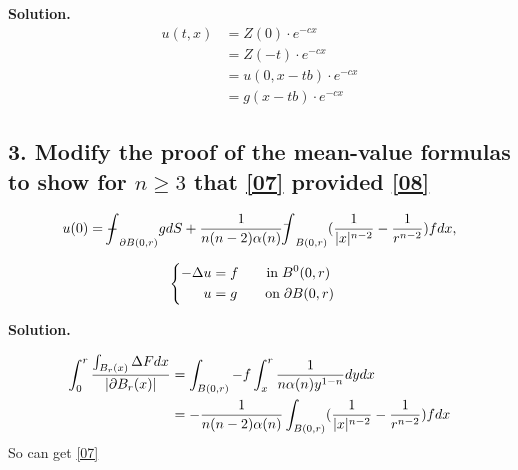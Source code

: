 \documentclass[a4paper]{book}
\newenvironment{solution}%
{\noindent\textbf{Solution.}}%
{\qedhere}
\newcommand\tbint{{\mathchar '26\mkern -14mu\int}}
\newcommand\dbbint{{-\mkern -19mu\int}}
\numberwithin{equation}{chapter}
\theoremstyle{definition}
\begin{document}
\begin{multicols}{2}
\begin{solution}
	\begin{equation}
		\begin{aligned}
		u(t, x) &= Z(0)\cdot e^{-cx} \\
		& = Z(-t)\cdot e^{-cx} \\
		& = u(0, x - tb)\cdot e^{-cx} \\
		& = g(x - tb) \cdot e^{-cx}
		\end{aligned}
	\end{equation}
\end{solution}
%


\subsection{3. Modify the proof of the mean-value formulas to show for $ n \geq 3$ that \ref{07} provided \ref{08} }

\small\begin{equation}\label{07}
	u(0) = \dbbint_{\partial \mathnormal{B}(0,r)} g d \mathnormal{S} + \frac{1}{n(n-2)\alpha(n)} \tbint_{\mathnormal{B}(0,r)}( \frac{1}{|x|^{n-2}} -
	 \frac{1}{r^{n-2}}) f dx, 
\end{equation}

\begin{equation}\label{08}
	\begin{cases}
	\begin{aligned}
	-\Delta u &= f \qquad \text{in} \; \mathnormal{B}^0(0,r) \\
	u &= g \qquad \text{on} \; \partial\mathnormal{B}(0,r)
	\end{aligned}
	
	\end{cases}
\end{equation}

\begin{solution}
	
%	
%	
	
	\begin{equation}
		\begin{aligned}
		\int_{0}^{r} \frac{\int_{\mathnormal{B}_r (x)} \Delta F dx}{| \partial \mathnormal{B}_r (x) |} &= \int_{\mathnormal{B}(0,r)} -f \int_{x}^{r} \frac{1}{n\alpha(n) y^{1-n}} dy dx \\
		&= -\frac{1}{n(n-2)\alpha(n)} \int_{ \mathnormal{B} (0, r)} ( \frac{1}{|x|^{n-2}} - \frac{1}{r^{n-2}}) f dx
		\end{aligned}
	\end{equation}
	So can get \ref{07}
	


\end{solution}
\end{multicols}
\end{document}
